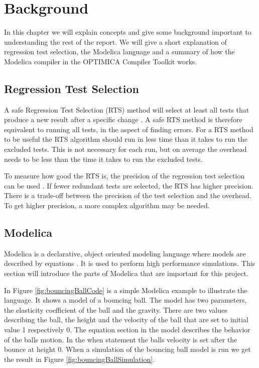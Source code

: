 \documentclass{cslthse-msc}
\begin{document}
\chapter[Background]{Background}
In this chapter we will explain concepts and give some background important to understanding the rest of the report. We will give a short explanation of regression test selection, the Modelica language and a summary of how the Modelica compiler in the OPTIMICA Compiler Toolkit works.

\section{Regression Test Selection}
A safe Regression Test Selection (RTS) method will select at least all tests that produce a new result after a specific change \cite{DBLP:conf/pppj/OqvistHM16}. A safe RTS method is therefore equivalent to running all tests, in the aspect of finding errors. For a RTS method to be useful the RTS algorithm should run in less time than it takes to run the excluded tests. This is not necessary for each run, but on average the overhead needs to be less than the time it takes to run the excluded tests.

To measure how good the RTS is, the precision of the regression test selection can be used \cite{DBLP:conf/sigsoft/LegunsenHSLZM16}. If fewer redundant tests are selected, the RTS has higher precision. There is a trade-off between the precision of the test selection and the overhead. To get higher precision, a more complex algorithm may be needed.

\section{Modelica}
Modelica is a declarative, object oriented modeling language where models are described by equations \cite{modelicamodelica}. It is used to perform high performance simulations. This section will introduce the parts of Modelica that are important for this project.

In Figure \ref{fig:bouncingBallCode} is a simple Modelica example to illustrate the language. It shows a model of a bouncing ball. The model has two parameters, the elasticity coefficient of the ball and the gravity. There are two values describing the ball, the height and the velocity of the ball that are set to initial value 1 respectively 0. The equation section in the model describes the behavior of the balls motion. In the when statement the balls velocity is set after the bounce at height 0. When a simulation of the bouncing ball model is run we get the result in Figure \ref{fig:bouncingBallSimulation}.
\end{document}

